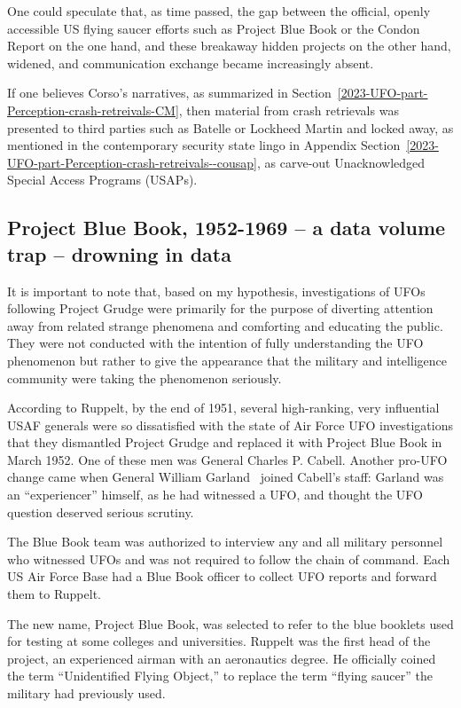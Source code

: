One could speculate that, as time passed, the gap between the official, openly accessible US flying saucer efforts such as Project Blue Book or the Condon Report on the one hand, and these breakaway hidden projects on the other hand, widened, and communication exchange became increasingly absent.

If one believes Corso's narratives, as summarized in Section~\ref{2023-UFO-part-Perception-crash-retreivals-CM},
then material from crash retrievals was presented to third parties such as Batelle or Lockheed Martin and locked away,
as mentioned in the contemporary security state lingo in Appendix Section~\ref{2023-UFO-part-Perception-crash-retreivals--cousap},
as carve-out Unacknowledged Special Access Programs (USAPs).



\subsection{Project Blue Book, 1952-1969 -- a data volume trap -- drowning in data}
\label{2023-UFO-part-Perception-types-USA-PBB}

It is important to note that, based on my hypothesis, investigations of UFOs following Project Grudge
were primarily for the purpose of diverting attention away from related strange phenomena and comforting and educating the public.
They were not conducted with the intention of fully understanding the UFO phenomenon but rather to give the appearance that the military and intelligence community were taking the phenomenon seriously.

According to Ruppelt, by the end of 1951, several high-ranking, very influential USAF generals were so dissatisfied
with the state of Air Force UFO investigations that they dismantled Project Grudge and replaced it with Project Blue Book in March 1952.
One of these men was General Charles P. Cabell.
Another pro-UFO change came when General William Garland~\cite{GarlandUSAF,GarlandProject1947} joined Cabell's staff:
Garland was an ``experiencer'' himself, as he had witnessed a UFO, and thought the UFO question deserved serious scrutiny.

The Blue Book team was authorized to interview any and all military personnel who witnessed UFOs and was not required to follow the chain of command. Each US Air Force Base had a Blue Book officer to collect UFO reports and forward them to Ruppelt.

The new name, Project Blue Book, was selected to refer to the blue booklets used for testing at some colleges and universities.
Ruppelt was the first head of the project, an experienced airman with
an aeronautics degree. He officially coined the term ``Unidentified Flying Object,'' to replace the term ``flying saucer'' the military had previously used.

